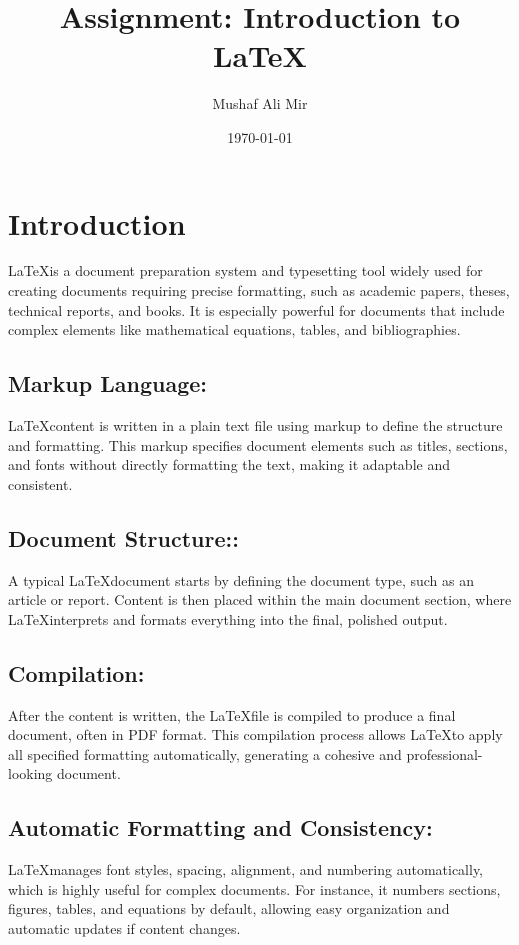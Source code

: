 \documentclass[12pt,a4paper]{article}
\title{Assignment: Introduction to \LaTeX}
\author{Mushaf Ali Mir}
\date{\today}
\begin{document}
	
	\maketitle
	
	\tableofcontents
	\newpage
	
	\section{Introduction}
	\LaTeX \space is a document preparation system and typesetting tool widely used for creating documents requiring precise formatting, such as academic papers, theses, technical reports, and books. It is especially powerful for documents that include complex elements like mathematical equations, tables, and bibliographies.
	\subsection*{\textbf{Markup Language:}}
	\LaTeX\space content is written in a plain text file using markup to define the structure and formatting. This markup specifies document elements such as titles, sections, and fonts without directly formatting the text, making it adaptable and consistent.
	\subsection*{\textbf{Document Structure::}}
	A typical \LaTeX\space document starts by defining the document type, such as an article or report. Content is then placed within the main document section, where \LaTeX\space interprets and formats everything into the final, polished output.
	\subsection*{\textbf{Compilation:}}
	After the content is written, the \LaTeX\space file is compiled to produce a final document, often in PDF format. This compilation process allows \LaTeX\space to apply all specified formatting automatically, generating a cohesive and professional-looking document.
	\subsection*{\textbf{Automatic Formatting and Consistency:}}
	\LaTeX\space manages font styles, spacing, alignment, and numbering automatically, which is highly useful for complex documents. For instance, it numbers sections, figures, tables, and equations by default, allowing easy organization and automatic updates if content changes.
\end{document}
